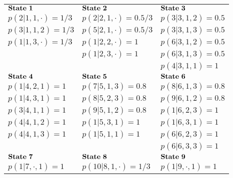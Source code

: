 \documentclass{acm_proc_article-sp}
\begin{document}
\begin{table}[htbp]
\scriptsize
\centering
\begin{tabular}{lll}\hline
$\begin{bf}State~1\end{bf}$         &$\begin{bf}State~2\end{bf}$        &$\begin{bf}State~3\end{bf}$\\
$p(2|1,1,\cdot)=1/3$                &$p(2|2,1,\cdot)=0.5/3$             &$p(3|3,1,2)=0.5$\\
$p(3|1,1,2)=1/3$                &$p(5|2,1,\cdot)=0.5/3$             &$p(3|3,1,3)=0.5$\\
$p(1|1,3,\cdot)=1/3$                &$p(1|2,2,\cdot)=1$             &$p(6|3,1,2)=0.5$\\
$ $                &$p(1|2,3,\cdot)=1$             &$p(6|3,1,3)=0.5$\\
$ $                &$ $             &$p(4|3,1,1)=1$\\
$\begin{bf}State~4\end{bf}$         &$\begin{bf}State~5\end{bf}$        &$\begin{bf}State~6\end{bf}$\\
$p(1|4,2,1)=1$                &$p(7|5,1,3)=0.8$             &$p(8|6,1,3)=0.8$\\
$p(1|4,3,1)=1$                &$p(8|5,2,3)=0.8$             &$p(9|6,1,2)=0.8$\\
$p(3|4,1,1)=1$                &$p(9|5,1,2)=0.8$             &$p(1|6,2,3)=1$\\
$p(4|4,1,2)=1$                &$p(1|5,3,1)=1$             &$p(1|6,3,1)=1$\\
$p(4|4,1,3)=1$                &$p(1|5,1,1)=1$             &$p(6|6,2,3)=1$\\
$ $                &$ $             &$p(6|6,3,3)=1$\\
$\begin{bf}State~7\end{bf}$         &$\begin{bf}State~8\end{bf}$        &$\begin{bf}State~9\end{bf}$\\
$p(1|7,\cdot,1)=1$                &$p(10|8,1,\cdot)=1/3$             &$p(1|9,\cdot,1)=1$\\

\end{tabular}
\end{table}
\end{document}
